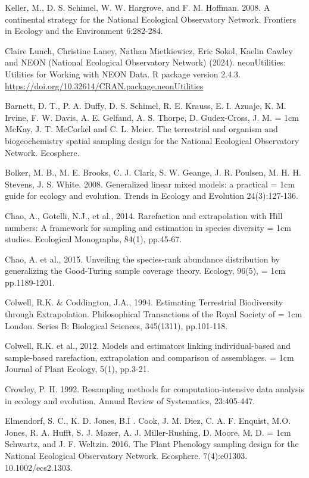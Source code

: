 \documentclass[
  11pt,
]{article}
\begin{document}
Keller, M., D. S. Schimel, W. W. Hargrove, and F. M. Hoffman. 2008. A
continental strategy for the National Ecological Observatory Network.
Frontiers in Ecology and the Environment 6:282-284.

Claire Lunch, Christine Laney, Nathan Mietkiewicz, Eric Sokol, Kaelin
Cawley and NEON (National Ecological Observatory Network) (2024).
neonUtilities: Utilities for Working with NEON Data. R package version
2.4.3. \url{https://doi.org/10.32614/CRAN.package.neonUtilities}

Barnett, D. T., P. A. Duffy, D. S. Schimel, R. E. Krauss, E. I. Azuaje,
K. M. Irvine, F. W. Davis, A. E. Gelfand, A. S. Thorpe, D. Gudex-Cross,
J. M. \hangindent= 1cm McKay, J. T. McCorkel and C. L. Meier. The
terrestrial and organism and biogeochemistry spatial sampling design for
the National Ecological Observatory Network. Ecosphere.

Bolker, M. B., M. E. Brooks, C. J. Clark, S. W. Geange, J. R. Poulsen,
M. H. H. Stevens, J. S. White. 2008. Generalized linear mixed models: a
practical \hangindent= 1cm guide for ecology and evolution. Trends in
Ecology and Evolution 24(3):127-136.

Chao, A., Gotelli, N.J., et al., 2014. Rarefaction and extrapolation
with Hill numbers: A framework for sampling and estimation in species
diversity \hangindent= 1cm studies. Ecological Monographs, 84(1),
pp.45-67.

Chao, A. et al., 2015. Unveiling the species-rank abundance distribution
by generalizing the Good-Turing sample coverage theory. Ecology, 96(5),
\hangindent= 1cm pp.1189-1201.

Colwell, R.K. \& Coddington, J.A., 1994. Estimating Terrestrial
Biodiversity through Extrapolation. Philosophical Transactions of the
Royal Society of \hangindent= 1cm London. Series B: Biological Sciences,
345(1311), pp.101-118.

Colwell, R.K. et al., 2012. Models and estimators linking
individual-based and sample-based rarefaction, extrapolation and
comparison of assemblages. \hangindent= 1cm Journal of Plant Ecology,
5(1), pp.3-21.

Crowley, P. H. 1992. Resampling methods for computation-intensive data
analysis in ecology and evolution. Annual Review of Systematics,
23:405-447.

Elmendorf, S. C., K. D. Jones, B.I . Cook, J. M. Diez, C. A. F. Enquist,
M.O. Jones, R. A. Hufft, S. J. Mazer, A. J. Miller-Rushing, D. Moore, M.
D. \hangindent= 1cm Schwartz, and J. F. Weltzin. 2016. The Plant
Phenology sampling design for the National Ecological Observatory
Network. Ecosphere. 7(4):e01303. 10.1002/ecs2.1303.
\end{document}
